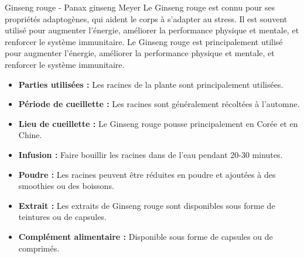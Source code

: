 \ficheidentiteplante
{Ginseng rouge - Panax ginseng Meyer}
{%
   }
{%
    Le Ginseng rouge est connu pour ses propriétés adaptogènes, qui aident le corps à s'adapter au stress. Il est souvent utilisé pour augmenter l'énergie, améliorer la performance physique et mentale, et renforcer le système immunitaire.
	Le Ginseng rouge est principalement utilisé pour augmenter l'énergie, améliorer la performance physique et mentale, et renforcer le système immunitaire.
 }
{%
    \begin{itemize}[label = \bcplume]
		\item \textbf{Parties utilisées :} Les racines de la plante sont principalement utilisées.
		\item \textbf{Période de cueillette :} Les racines sont généralement récoltées à l'automne.
		\item \textbf{Lieu de cueillette :} Le Ginseng rouge pousse principalement en Corée et en Chine.
\end{itemize}
    }

{%
    \begin{itemize}
		\item \textbf{Infusion :} Faire bouillir les racines dans de l'eau pendant 20-30 minutes.
		\item \textbf{Poudre :} Les racines peuvent être réduites en poudre et ajoutées à des smoothies ou des boissons.
		\item \textbf{Extrait :} Les extraits de Ginseng rouge sont disponibles sous forme de teintures ou de capsules.
		\item \textbf{Complément alimentaire :} Disponible sous forme de capsules ou de comprimés.
\end{itemize}
}

{%
\begin{multicols}{2}


    \columnbreak


\end{multicols}
}

